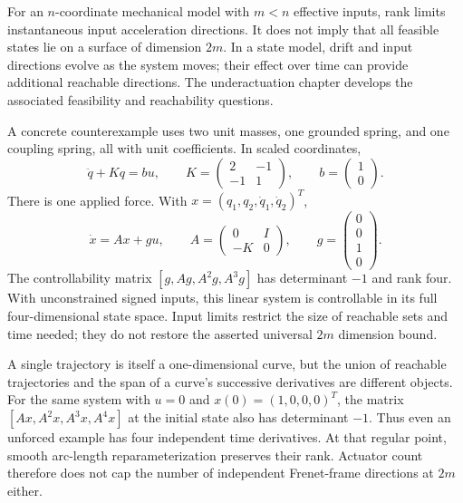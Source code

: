 For an $n$-coordinate mechanical model with $m<n$ effective inputs, rank limits
instantaneous input acceleration directions. It does not imply that all feasible
states lie on a surface of dimension $2m$. In a state model, drift and input
directions evolve as the system moves; their effect over time can provide
additional reachable directions. The underactuation chapter develops the
associated feasibility and reachability questions.

A concrete counterexample uses two unit masses, one grounded spring, and one
coupling spring, all with unit coefficients. In scaled coordinates,
\begin{equation}
 \ddot q+Kq=bu,\qquad
 K=\begin{pmatrix}2&-1\\-1&1\end{pmatrix},\qquad
 b=\begin{pmatrix}1\\0\end{pmatrix}.
 \label{eq:motion_coupled_springs}
\end{equation}
There is one applied force. With $x=(q_1,q_2,\dot q_1,\dot q_2)^T$,
\begin{equation}
 \dot x=Ax+gu,\qquad
 A=\begin{pmatrix}0&I\\-K&0\end{pmatrix},\qquad
 g=\begin{pmatrix}0\\0\\1\\0\end{pmatrix}.
 \label{eq:motion_spring_state}
\end{equation}
The controllability matrix $[g,Ag,A^2g,A^3g]$ has determinant $-1$ and rank
four. With unconstrained signed inputs, this linear system is controllable in
its full four-dimensional state space. Input limits restrict the size of
reachable sets and time needed; they do not restore the asserted universal
$2m$ dimension bound.

A single trajectory is itself a one-dimensional curve, but the union of
reachable trajectories and the span of a curve's successive derivatives are
different objects. For the same system with $u=0$ and $x(0)=(1,0,0,0)^T$,
the matrix $[Ax,A^2x,A^3x,A^4x]$ at the initial state also has determinant
$-1$. Thus even an unforced example has four independent time derivatives.
At that regular point, smooth arc-length reparameterization preserves their
rank. Actuator count therefore does not cap the number of independent
Frenet-frame directions at $2m$ either.

